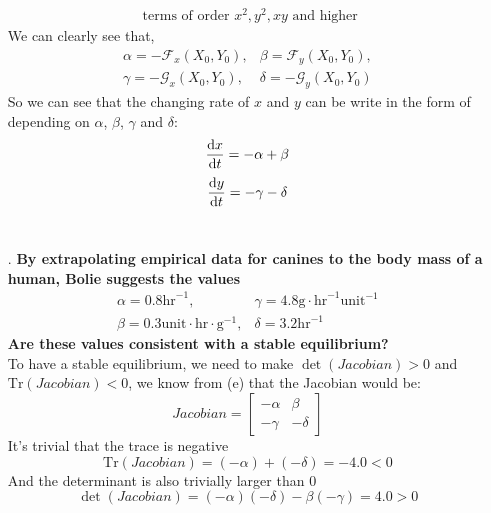 \begin{homeworkProblem}
\begin{enumerate}
\begin{equation}
\begin{split}
    \text{ terms of order }x^2, y^2, xy\text{ and higher}
\end{split}
\end{equation}
We can clearly see that, \[
\begin{matrix}
\alpha = -\mathcal{F}_x(X_0,Y_0), & \beta = \mathcal{F}_y(X_0, Y_0),\\
\gamma = -\mathcal{G}_x(X_0,Y_0), & \delta = -\mathcal{G}_y(X_0, Y_0)
\end{matrix}
\]
So we can see that the changing rate of $x$ and $y$ can be write in the form of depending on $\alpha$, $\beta$, $\gamma$ and $\delta$:
\begin{equation}
        \deriv[t]{x} = -\alpha + \beta
\end{equation}
\begin{equation}
    \deriv[t]{y} = -\gamma - \delta
\end{equation}\\

\addtocounter{enumi}{1}
\item[\color{red}\theenumi.] \textbf{By extrapolating empirical data for canines to the body mass of a human, Bolie suggests the values \[
    \begin{matrix}
        \alpha = 0.8 \text{hr}^{-1}, & \gamma = 4.8\text{g}\cdot\text{hr}^{-1}\text{unit}^{-1}\\
        \beta = 0.3 \text{unit}\cdot\text{hr}\cdot\text{g}^{-1}, & \delta = 3.2 \text{hr}^{-1}
    \end{matrix}
\]
Are these values consistent with a stable equilibrium?}\\

To have a stable equilibrium, we need to make $\det(Jacobian) > 0$ and $\text{Tr}(Jacobian) < 0$, we know from (e) that the Jacobian would be: \[
    Jacobian = \begin{bmatrix}
        -\alpha & \beta \\
        -\gamma & -\delta
    \end{bmatrix}
\]
It's trivial that the trace is negative\[
    \text{Tr}(Jacobian) = (-\alpha) + (-\delta) =  -4.0 < 0
\]
And the determinant is also trivially larger than 0\[
    \det(Jacobian) = (-\alpha)(-\delta) - \beta(-\gamma) = 4.0 >0
\]

\end{enumerate}
\end{homeworkProblem}
